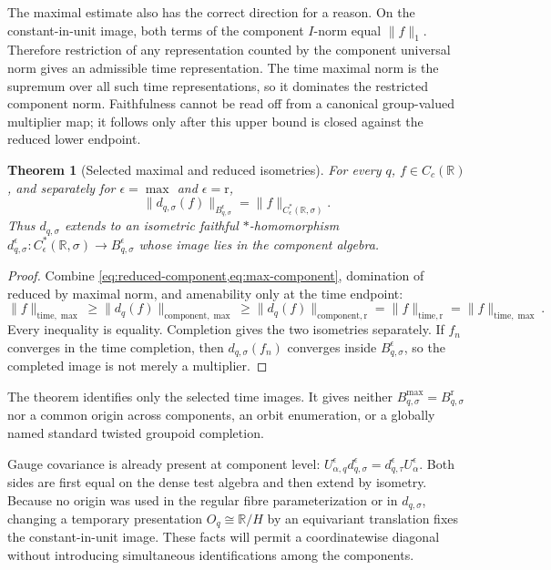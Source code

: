 \documentclass[11pt]{article}
\newtheorem{theorem}{Theorem}[section]
\theoremstyle{definition}
\newcommand{\R}{\mathbb R}
\begin{document}
The maximal estimate also has the correct direction for a reason.  On the
constant-in-unit image, both terms of the component $I$-norm equal
$\lVert f\rVert_1$.  Therefore restriction of any representation counted by
the component universal norm gives an admissible time representation.  The
time maximal norm is the supremum over all such time representations, so it
dominates the restricted component norm.  Faithfulness cannot be read off
from a canonical group-valued multiplier map; it follows only after this
upper bound is closed against the reduced lower endpoint.

\begin{theorem}[Selected maximal and reduced isometries]\label{thm:component-isometry}
For every $q$, $f\in C_c(\R)$, and separately for
$\epsilon=\max$ and $\epsilon=\mathrm r$,
\[
 \lVert d_{q,\sigma}(f)\rVert_{B_{q,\sigma}^{\epsilon}}
   =\lVert f\rVert_{C^*_{\epsilon}(\R,\sigma)}.
\]
Thus $d_{q,\sigma}$ extends to an isometric faithful $*$-homomorphism
$d_{q,\sigma}^{\epsilon}:C^*_{\epsilon}(\R,\sigma)
\to B_{q,\sigma}^{\epsilon}$ whose image lies in the component algebra.
\end{theorem}

\begin{proof}
Combine \cref{eq:reduced-component,eq:max-component}, domination of reduced
by maximal norm, and amenability only at the time endpoint:
\[
 \lVert f\rVert_{\mathrm{time},\max}
 \geq \lVert d_q(f)\rVert_{\mathrm{component},\max}
 \geq \lVert d_q(f)\rVert_{\mathrm{component},\mathrm r}
 =\lVert f\rVert_{\mathrm{time},\mathrm r}
 =\lVert f\rVert_{\mathrm{time},\max}.
\]
Every inequality is equality.  Completion gives the two isometries
separately.  If $f_n$ converges in the time completion, then
$d_{q,\sigma}(f_n)$ converges inside $B_{q,\sigma}^{\epsilon}$, so the
completed image is not merely a multiplier.
\end{proof}

The theorem identifies only the selected time images.  It gives neither
$B_{q,\sigma}^{\max}=B_{q,\sigma}^{\mathrm r}$ nor a common origin across
components, an orbit enumeration, or a globally named standard twisted
groupoid completion.

Gauge covariance is already present at component level:
$U_{\alpha,q}^{\epsilon}d_{q,\sigma}^{\epsilon}
=d_{q,\tau}^{\epsilon}U_\alpha^{\epsilon}$.  Both sides are first equal on
the dense test algebra and then extend by isometry.  Because no origin was
used in the regular fibre parameterization or in $d_{q,\sigma}$, changing a
temporary presentation $O_q\cong\R/H$ by an equivariant translation fixes
the constant-in-unit image.  These facts will permit a coordinatewise
diagonal without introducing simultaneous identifications among the
components.
\end{document}
